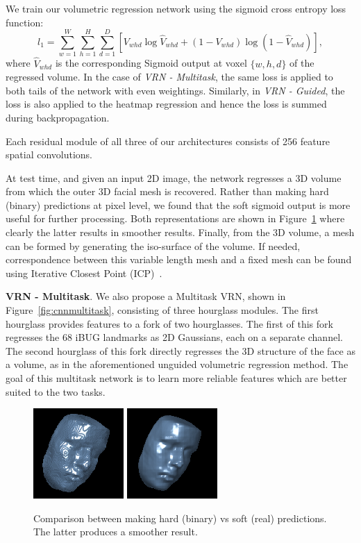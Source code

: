 We train our volumetric regression network using the sigmoid cross
entropy loss function:
\begin{equation} l_{1} = \sum\limits_{w=1}^{W}
  \sum\limits_{h=1}^{H}\sum\limits_{d=1}^{D}[V_{whd}\log
  \widehat{V}_{whd}+(1-V_{whd})\log(1-\widehat{V}_{whd})],
\end{equation} where $\widehat{V}_{whd}$ is the corresponding Sigmoid
output at voxel $\{w,h,d\}$ of the regressed volume. In the case of
\textit{VRN - Multitask}, the same loss is applied to both tails of
the network with even weightings. Similarly, in \textit{VRN - Guided},
the loss is also applied to the heatmap regression and hence the loss
is summed during backpropagation.

Each residual module of all three of our architectures consists of 256
feature spatial convolutions.

At test time, and given an input 2D image, the network regresses a 3D
volume from which the outer 3D facial mesh is recovered. Rather than
making hard (binary) predictions at pixel level, we found that the
soft sigmoid output is more useful for further processing. Both
representations are shown in Figure~\ref{fig:roughvssmooth} where
clearly the latter results in smoother results. Finally, from the 3D
volume, a mesh can be formed by generating the iso-surface of the
volume. If needed, correspondence between this variable length mesh
and a fixed mesh can be found using Iterative Closest Point
(ICP)~\cite{besl1992method}.

\textbf{VRN - Multitask}. We also propose a Multitask VRN, shown in
Figure~\ref{fig:cnnmultitask}, consisting of three hourglass
modules. The first hourglass provides features to a fork of two
hourglasses. The first of this fork regresses the 68 iBUG landmarks
\cite{sagonas2013semi} as 2D Gaussians, each on a separate
channel. The second hourglass of this fork directly regresses the 3D
structure of the face as a volume, as in the aforementioned unguided
volumetric regression method. The goal of this multitask network is to
learn more reliable features which are better suited to the two tasks.


\begin{figure}
  \centering
  \includegraphics[width=0.2\linewidth]{img/example_rough.png}
  \includegraphics[width=0.2\linewidth]{img/example_smooth.png}
  \caption[Binary vs Real volumes]{Comparison between making hard
    (binary) vs soft (real) predictions. The latter produces a
    smoother result.}
  \label{fig:roughvssmooth}
  \vspace{-4mm}
\end{figure}


